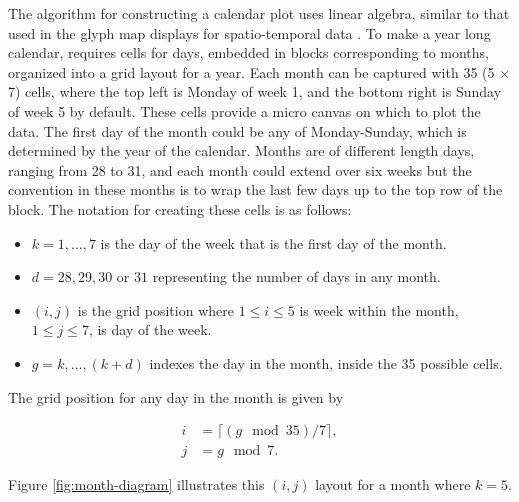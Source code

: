 \documentclass[article]{jss}
\providecommand{\tightlist}{%
  \setlength{\itemsep}{0pt}\setlength{\parskip}{0pt}}
\theoremstyle{definition}
\theoremstyle{definition}
\theoremstyle{remark}
\begin{document}
The algorithm for constructing a calendar plot uses linear algebra,
similar to that used in the glyph map displays for spatio-temporal data
\citep{Wickham2012glyph}. To make a year long calendar, requires cells
for days, embedded in blocks corresponding to months, organized into a
grid layout for a year. Each month can be captured with 35 (5 \(\times\)
7) cells, where the top left is Monday of week 1, and the bottom right
is Sunday of week 5 by default. These cells provide a micro canvas on
which to plot the data. The first day of the month could be any of
Monday-Sunday, which is determined by the year of the calendar. Months
are of different length days, ranging from 28 to 31, and each month
could extend over six weeks but the convention in these months is to
wrap the last few days up to the top row of the block. The notation for
creating these cells is as follows:

\begin{itemize}
\tightlist
\item
  \(k = 1, \dots , 7\) is the day of the week that is the first day of
  the month.
\item
  \(d = 28, 29, 30\) or \(31\) representing the number of days in any
  month.
\item
  \((i, j)\) is the grid position where \(1 \le i \le 5\) is week within
  the month, \(1 \le j \le 7\), is day of the week.
\item
  \(g = k, \dots,(k+d)\) indexes the day in the month, inside the 35
  possible cells.
\end{itemize}

The grid position for any day in the month is given by

\begin{equation}
  \begin{aligned}
  i &= \lceil (g \mod 35) / 7\rceil, \\
  j &= g \mod 7. \label{eq:grid}
  \end{aligned}
\end{equation}

Figure \ref{fig:month-diagram} illustrates this \((i,j)\) layout for a
month where \(k=5\).
\end{document}
